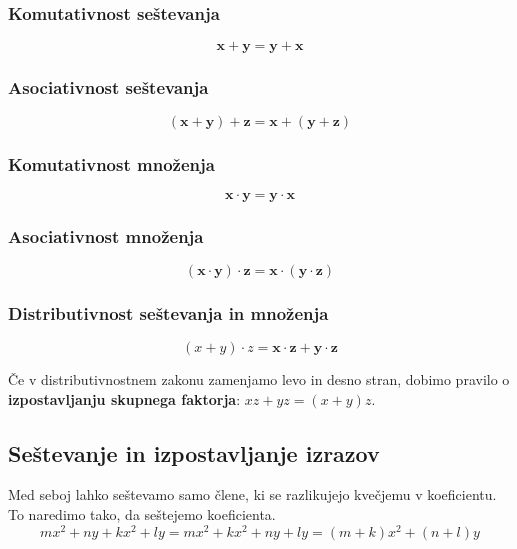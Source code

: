     \begin{multicols}{2}
        
                \subsubsection*{Komutativnost seštevanja}
                    $$ \mathbf{x+ y=y+ x}$$
                
    
                    \subsubsection*{Asociativnost seštevanja}
                    $$ \mathbf{(x+ y)+ z=x+ (y+ z)}$$
                
    
    
                    \subsubsection*{Komutativnost množenja}
                   $$ \mathbf{x\cdot y=y\cdot x}$$
                
    
                   \subsubsection*{Asociativnost množenja}
                    $$ \mathbf{(x\cdot y)\cdot z=x\cdot (y\cdot z)}$$
                
    \end{multicols}
    
                \subsubsection*{Distributivnost seštevanja in množenja}
                    $$ (x+y)\cdot z=\mathbf{x\cdot z+y\cdot z} $$
                
        
    
        
            
                Če v distributivnostnem zakonu zamenjamo levo in desno stran, dobimo pravilo o \textbf{izpostavljanju skupnega faktorja}: $xz+yz=(x+y)z$.
            
    
            \subsection{Seštevanje in izpostavljanje izrazov}
                Med seboj lahko seštevamo samo člene, ki se razlikujejo kvečjemu v koeficientu. To naredimo tako, da seštejemo koeficienta.
                $$mx^2+ny+kx^2+ly=mx^2+kx^2+ny+ly=(m+k)x^2+(n+l)y $$
            
